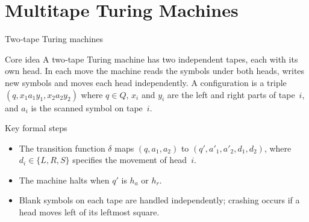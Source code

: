 %

\section{Multitape Turing Machines}

\begin{frame}[t]{Two‑tape Turing machines}
  \begin{tblock}{Core idea}
    A two‑tape Turing machine has two independent tapes, each with its
    own head.  In each move the machine reads the symbols under both
    heads, writes new symbols and moves each head independently.  A
    configuration is a triple $(q,x_1 a_1 y_1,x_2 a_2 y_2)$ where
    $q\in Q$, $x_i$ and $y_i$ are the left and right parts of tape $i$,
    and $a_i$ is the scanned symbol on tape $i$.
  \end{tblock}
  \begin{tblock}{Key formal steps}
    \begin{itemize}
      \item The transition function $\delta$ maps $(q,a_1,a_2)$ to
        $(q',a'_1,a'_2,d_1,d_2)$, where $d_i \in \{L,R,S\}$ specifies the
        movement of head $i$.
      \item The machine halts when $q'$ is $h_a$ or $h_r$.
      \item Blank symbols on each tape are handled independently;
        crashing occurs if a head moves left of its leftmost square.
    \end{itemize}
  \end{tblock}
  \label{fr:7.5-01}
\end{frame}


